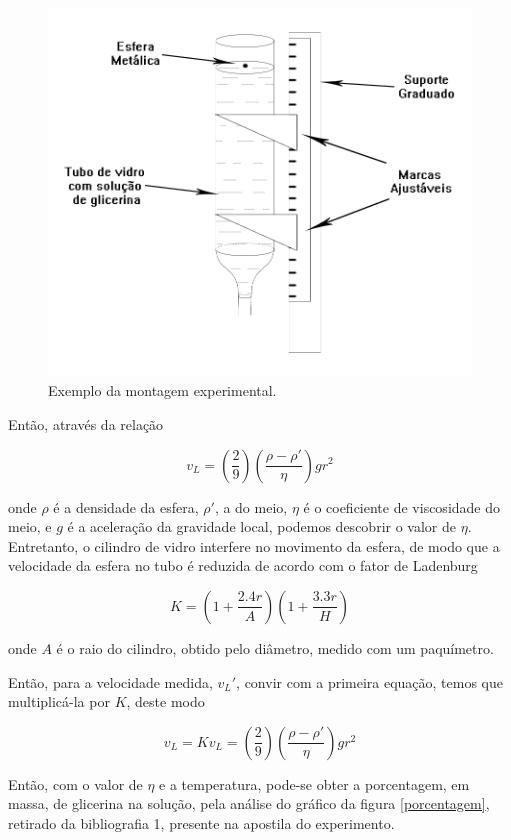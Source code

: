 \documentclass[12pt,a4paper]{article}
\begin{document}
\begin{figure}[!htbp]
\centering
\includegraphics[scale=0.3]{Fig5-1.jpg}
\caption{Exemplo da montagem experimental.}
\label{experimento}
\end{figure}

Então, através da relação

$$v_L = (\frac{2}{9}) (\frac{\rho - \rho'}{\eta}) g r^2$$

onde $\rho$ é a densidade da esfera, $\rho'$, a do meio, $\eta$ é o coeficiente de viscosidade do meio, e $g$ é a aceleração da gravidade local, podemos descobrir o valor de $\eta$.\\

Entretanto, o cilindro de vidro interfere no movimento da esfera, de modo que a velocidade da esfera no tubo é reduzida de acordo com o fator de Ladenburg

$$K = (1 + \frac{2.4r}{A})(1 + \frac{3.3r}{H})$$

onde $A$ é o raio do cilindro, obtido pelo diâmetro, medido com um paquímetro.

Então, para a velocidade medida, $v_L'$, convir com a primeira equação, temos que multiplicá-la por $K$, deste modo

$$v_L = Kv_L = (\frac{2}{9}) (\frac{\rho - \rho'}{\eta}) g r^2$$

Então, com o valor de $\eta$ e a temperatura, pode-se obter a porcentagem, em massa, de glicerina na solução, pela análise do gráfico da figura \ref{porcentagem}, retirado da bibliografia 1, presente na apostila do experimento.\\
\end{document}

